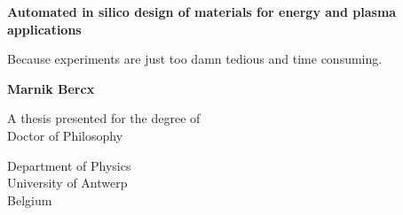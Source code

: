 \begin{titlepage}
   \begin{center}
       \vspace*{1cm}
 
       \textbf{Automated in silico design of materials for energy and plasma applications}
 
       \vspace{0.5cm}
        Because experiments are just too damn tedious and time consuming.
 
       \vspace{1.5cm}
 
       \textbf{Marnik Bercx}
 
       \vfill
 
       A thesis presented for the degree of\\
       Doctor of Philosophy
 
       \vspace{0.8cm}
 
       Department of Physics\\
       University of Antwerp\\
       Belgium\\
 
   \end{center}
\end{titlepage}